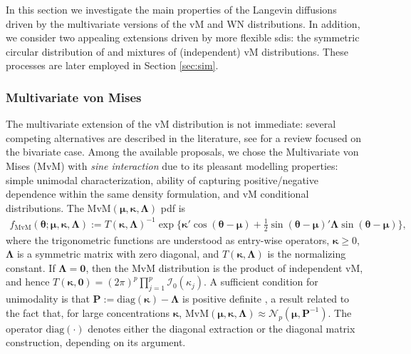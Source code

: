 \documentclass[oneside,11pt]{article}
\newcommand{\lp}{\left(}
\newcommand{\rp}{\right)}
\newcommand{\bmu}{\boldsymbol\mu}
\newcommand{\btheta}{\boldsymbol\theta}
\newcommand{\bkappa}{\boldsymbol\kappa}
\newcommand{\Ical}{\mathcal{I}}
\newcommand{\bLambda}{\boldsymbol\Lambda}
\newcommand{\diag}[1]{\mathrm{diag}\lp #1\rp}
\begin{document}
In this section we investigate the main properties of the Langevin diffusions driven by the multivariate versions of the vM and WN distributions. In addition, we consider two appealing extensions driven by more flexible sdis: the symmetric circular distribution of \cite{Jones2005} and mixtures of (independent) vM distributions. These processes are later employed in Section \ref{sec:sim}.

\subsubsection{Multivariate von Mises}

The multivariate extension of the vM distribution is not immediate: several competing alternatives are described in the literature, see \cite{Mardia2012a} for a review focused on the bivariate case. Among the available proposals, we chose the Multivariate von Mises (MvM) with \textit{sine interaction} \citep{Mardia2008} due to its pleasant modelling properties: simple unimodal characterization, ability of capturing positive/negative dependence within the same density formulation, and vM conditional distributions. The $\mathrm{MvM}(\bmu,\bkappa,\bLambda)$ pdf is
\begin{align*}
f_{\mathrm{MvM}}(\btheta;\bmu,\bkappa,\bLambda):=T(\bkappa,\bLambda)^{-1}\exp\bigg\{\bkappa' \cos(\btheta-\bmu)+\frac{1}{2}\sin(\btheta-\bmu)'\bLambda \sin(\btheta-\bmu)\bigg\},
\end{align*}
where the trigonometric functions are understood as entry-wise operators, $\bkappa\geq0$, $\bLambda$ is a symmetric matrix with zero diagonal, and $T(\bkappa,\bLambda)$ is the normalizing constant. If $\bLambda=\mathbf 0$, then the MvM distribution is the product of independent vM, and hence $T(\bkappa,\mathbf 0)=(2\pi)^p\prod_{j=1}^p\Ical_0(\kappa_j)$. A sufficient condition for unimodality is that $\mathbf{P}:=\diag{\bkappa}-\bLambda$ is positive definite \citep{Mardia2014}, a result related to the fact that, for large concentrations $\bkappa$, $\mathrm{MvM}(\bmu,\bkappa,\bLambda)\approx \mathcal{N}_p(\bmu,\mathbf{P}^{-1})$. The operator $\mathrm{diag}(\cdot)$ denotes either the diagonal extraction or the diagonal matrix construction, depending on its argument.\\
\end{document}

